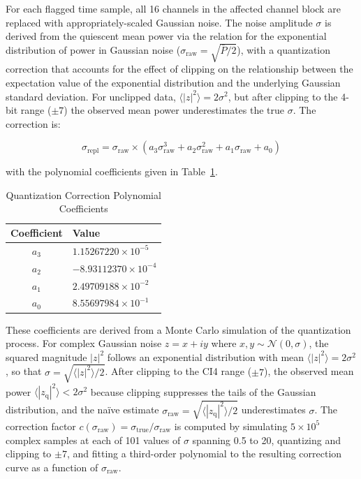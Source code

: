 For each flagged time sample, all 16 channels in the affected channel block are replaced with appropriately-scaled Gaussian noise. The noise amplitude $\sigma$ is derived from the quiescent mean power via the relation for the exponential distribution of power in Gaussian noise ($\sigma_\mathrm{raw} = \sqrt{\bar{P}/2}$), with a quantization correction that accounts for the effect of clipping on the relationship between the expectation value of the exponential distribution and the underlying Gaussian standard deviation. For unclipped data, $\langle |z|^2 \rangle = 2\sigma^2$, but after clipping to the 4-bit range ($\pm 7$) the observed mean power underestimates the true $\sigma$. The correction is:

\begin{equation}
    \sigma_\mathrm{repl} = \sigma_\mathrm{raw} \times \left( a_3 \sigma_\mathrm{raw}^3 + a_2 \sigma_\mathrm{raw}^2 + a_1 \sigma_\mathrm{raw} + a_0 \right)
\end{equation}

\noindent with the polynomial coefficients given in Table~\ref{tab:quantcorr-coeffs}.

\begin{table}[htbp]
    \centering
    \caption{Quantization Correction Polynomial Coefficients}
    \label{tab:quantcorr-coeffs}
    \begin{tabular}{cl}
        \toprule
        \textbf{Coefficient} & \textbf{Value} \\
        \midrule
        $a_3$ & $1.15267220 \times 10^{-5}$ \\
        $a_2$ & $-8.93112370 \times 10^{-4}$ \\
        $a_1$ & $2.49709188 \times 10^{-2}$ \\
        $a_0$ & $8.55697984 \times 10^{-1}$ \\
        \bottomrule
    \end{tabular}
\end{table}

These coefficients are derived from a Monte Carlo simulation of the quantization process. For complex Gaussian noise $z = x + iy$ where $x, y \sim \mathcal{N}(0, \sigma)$, the squared magnitude $|z|^2$ follows an exponential distribution with mean $\langle |z|^2 \rangle = 2\sigma^2$, so that $\sigma = \sqrt{\langle |z|^2 \rangle / 2}$. After clipping to the CI4 range ($\pm 7$), the observed mean power $\langle |z_\mathrm{q}|^2 \rangle < 2\sigma^2$ because clipping suppresses the tails of the Gaussian distribution, and the na\"ive estimate $\sigma_\mathrm{raw} = \sqrt{\langle |z_\mathrm{q}|^2 \rangle / 2}$ underestimates $\sigma$. The correction factor $c(\sigma_\mathrm{raw}) = \sigma_\mathrm{true} / \sigma_\mathrm{raw}$ is computed by simulating $5 \times 10^5$ complex samples at each of 101 values of $\sigma$ spanning 0.5 to 20, quantizing and clipping to $\pm 7$, and fitting a third-order polynomial to the resulting correction curve as a function of $\sigma_\mathrm{raw}$.

